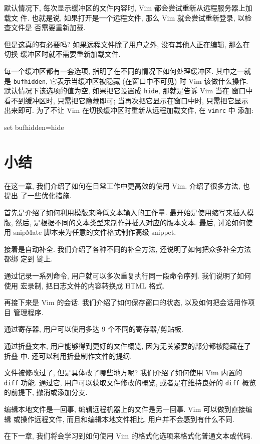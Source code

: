 默认情况下, 每次显示缓冲区的文件内容时, Vim 都会尝试重新从远程服务器上加载文
件. 也就是说, 如果打开是一个远程文件, 那么 Vim 就会尝试重新登录, 以检查文件是
否需要重新加载.

但是这真的有必要吗? 如果远程文件除了用户之外, 没有其他人正在编辑, 那么在切换
缓冲区时就不需要重新加载文件.

每一个缓冲区都有一套选项, 指明了在不同的情况下如何处理缓冲区. 其中之一就是
\texttt{bufhidden}, 它表示当缓冲区被隐藏 (在窗口中不可见) 时 Vim 该做什么操作.
默认情况下该选项的值为空, 如果把它设置成 \texttt{hide}, 那就是告诉 Vim 当在
窗口中看不到缓冲区时, 只需把它隐藏即可; 当再次把它显示在窗口中时, 只需把它显示
出来即可. 为了不让 Vim 在切换缓冲区时重新从远程加载文件, 在 \texttt{vimrc} 中
添加:
\begin{vimcode}
set bufhidden=hide
\end{vimcode}

\section{小结}
\label{sec:production_boosters_summary}

在这一章, 我们介绍了如何在日常工作中更高效的使用 Vim. 介绍了很多方法, 也提出
了一些优化措施.

首先是介绍了如何利用模版来降低文本输入的工作量. 最开始是使用缩写来插入模版,
然后, 是根据不同的文本类型来制作并插入对应的版本文本. 最后, 讨论如何使用
snipMate 脚本来为任意的文件格式制作高级 snippet.

接着是自动补全. 我们介绍了各种不同的补全方法, 还说明了如何把众多补全方法都绑
定到  键上.

通过记录一系列命令, 用户就可以多次重复执行同一段命令序列. 我们说明了如何使用
宏录制, 把日志文件的内容转换成 HTML 格式.

再接下来是 Vim 的会话. 我们介绍了如何保存窗口的状态, 以及如何把会话用作项目
管理程序.

通过寄存器, 用户可以使用多达 9 个不同的寄存器/剪贴板.

通过折叠文本, 用户能够得到更好的文件概览, 因为无关紧要的部分都被隐藏在了折叠
中. 还可以利用折叠制作文件的提纲.

文件被修改过了, 但是具体改了哪些地方呢? 我们介绍了如何使用 Vim 内置的
\texttt{diff} 功能. 通过它, 用户可以获取文件修改的概览, 或者是在维持良好的
\texttt{diff} 概览的前提下, 撤消或添加分支.

编辑本地文件是一回事, 编辑远程机器上的文件是另一回事. Vim 可以做到直接编辑
或操作远程文件, 而且和编辑本地文件相比, 用户并不会感到有什么不同.

在下一章, 我们将会学习到如何使用 Vim 的格式化选项来格式化普通文本或代码.
